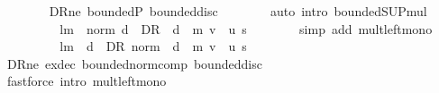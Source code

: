 \begin{isabellebody}
\ \ \ \ \ \ \isamarkupfalse%
\ D\isactrlsub R{\isacharunderscore}{\kern0pt}ne\ bounded{\isacharunderscore}{\kern0pt}P\ bounded{\isacharunderscore}{\kern0pt}disc{\isacharunderscore}{\kern0pt}{\isasymP}\isanewline
\ \ \ \ \ \ \isamarkupfalse%
\ {\isacharparenleft}{\kern0pt}auto\ intro{\isacharcolon}{\kern0pt}\ bounded{\isacharunderscore}{\kern0pt}SUP{\isacharunderscore}{\kern0pt}mul{\isacharparenright}{\kern0pt}\isanewline
\ \ \ \ \isamarkupfalse%
\ \isamarkupfalse%
\ {\isachardoublequoteopen}{\isasymdots}\ {\isasymle}\ l{\isacharcircum}{\kern0pt}m\ {\isacharasterisk}{\kern0pt}\ norm\ {\isacharparenleft}{\kern0pt}{\isasymSqunion}d\ {\isasymin}\ D\isactrlsub R{\isachardot}{\kern0pt}\ {\isacharparenleft}{\kern0pt}{\isacharparenleft}{\kern0pt}{\isasymP}\ d\ {\isacharcircum}{\kern0pt}{\isacharcircum}{\kern0pt}\ m{\isacharparenright}{\kern0pt}\ {\isacharparenleft}{\kern0pt}v\ {\isacharminus}{\kern0pt}\ u{\isacharparenright}{\kern0pt}\ s{\isacharparenright}{\kern0pt}{\isacharparenright}{\kern0pt}{\isachardoublequoteclose}\isanewline
\ \ \ \ \ \ \isamarkupfalse%
\ {\isacharparenleft}{\kern0pt}simp\ add{\isacharcolon}{\kern0pt}\ mult{\isacharunderscore}{\kern0pt}left{\isacharunderscore}{\kern0pt}mono{\isacharparenright}{\kern0pt}\isanewline
\ \ \ \ \isamarkupfalse%
\ \isamarkupfalse%
\ {\isachardoublequoteopen}{\isasymdots}\ {\isasymle}\ l{\isacharcircum}{\kern0pt}m\ {\isacharasterisk}{\kern0pt}\ {\isacharparenleft}{\kern0pt}{\isasymSqunion}d\ {\isasymin}\ D\isactrlsub R{\isachardot}{\kern0pt}\ norm\ {\isacharparenleft}{\kern0pt}{\isacharparenleft}{\kern0pt}{\isacharparenleft}{\kern0pt}{\isasymP}\ d\ {\isacharcircum}{\kern0pt}{\isacharcircum}{\kern0pt}\ m{\isacharparenright}{\kern0pt}\ {\isacharparenleft}{\kern0pt}v\ {\isacharminus}{\kern0pt}\ u{\isacharparenright}{\kern0pt}\ s{\isacharparenright}{\kern0pt}{\isacharparenright}{\kern0pt}{\isacharparenright}{\kern0pt}{\isachardoublequoteclose}\isanewline
\ \ \ \ \ \ \isamarkupfalse%
\ D\isactrlsub R{\isacharunderscore}{\kern0pt}ne\ ex{\isacharunderscore}{\kern0pt}dec\ bounded{\isacharunderscore}{\kern0pt}norm{\isacharunderscore}{\kern0pt}comp\ bounded{\isacharunderscore}{\kern0pt}disc{\isacharunderscore}{\kern0pt}{\isasymP}\isanewline
\ \ \ \ \ \ \isamarkupfalse%
\ {\isacharparenleft}{\kern0pt}fastforce\ intro{\isacharbang}{\kern0pt}{\isacharcolon}{\kern0pt}\ mult{\isacharunderscore}{\kern0pt}left{\isacharunderscore}{\kern0pt}mono{\isacharparenright}{\kern0pt}\isanewline

\end{isabellebody}
